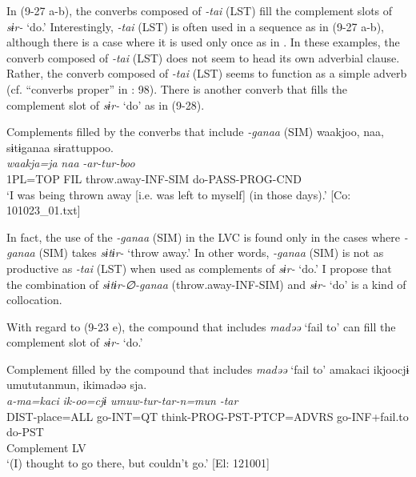 In (9-27 a-b), the converbs composed of \textit{{}-tai} (LST) fill the complement slots of \textit{sɨr-} ‘do.’ Interestingly, \textit{{}-tai} (LST) is often used in a sequence as in (9-27 a-b), although there is a case where it is used only once as in . In these examples, the converb composed of \textit{{}-tai} (LST) does not seem to head its own adverbial clause. Rather, the converb composed of \textit{{}-tai} (LST) seems to function as a simple adverb (cf. “converbs proper” in \citealt{Nedjalkov1995}: 98). There is another converb that fills the complement slot of \textit{sɨr-} ‘do’ as in (9-28).

\ea   Complements filled by the converbs that include \textit{{}-ganaa} (SIM) \label{ex:9.28}
 \glll  waakjoo,  naa,  sɨtɨganaa  sɨrattuppoo.\\
    \textit{waakja=ja}  \textit{naa}  \textit{}  \textit{-ar-tur-boo}\\
    1PL=TOP  FIL  throw.away-INF-SIM  do-PASS-PROG-CND\\
    \glt     ‘I was being thrown away [i.e. was left to myself] (in those days).’ [Co: 101023\_01.txt]
\z

In fact, the use of the \textit{{}-ganaa} (SIM) in the LVC is found only in the cases where \textit{{}-ganaa} (SIM) takes \textit{sɨtɨr-} ‘throw away.’ In other words, \textit{{}-ganaa} (SIM) is not as productive as \textit{{}-tai} (LST) when used as complements of \textit{sɨr-} ‘do.’ I propose that the combination of \textit{sɨtɨr-∅-ganaa} (throw.away-INF-SIM) and \textit{sɨr-} ‘do’ is a kind of collocation.

With regard to (9-23 e), the compound that includes \textit{madəə} ‘fail to’ can fill the complement slot of \textit{sɨr-} ‘do.’

\ea   Complement filled by the compound that includes \textit{madəə} ‘fail to’ \label{ex:9.29}
 \gllll  amakaci  ikjoocjɨ  umututanmun,   ikimadəə  sja.  \\
    \textit{a-ma=kaci}  \textit{ik-oo=cjɨ}  \textit{umuw-tur-tar-n=mun}    \textit{}  \textit{-tar} \\
    DIST-place=ALL  go-INT=QT  think-PROG-PST-PTCP=ADVRS  go-INF+fail.to  do-PST  \\
                                                           Complement  LV  \\
  \glt     ‘(I) thought to go there, but couldn’t go.’ [El: 121001]
\z


